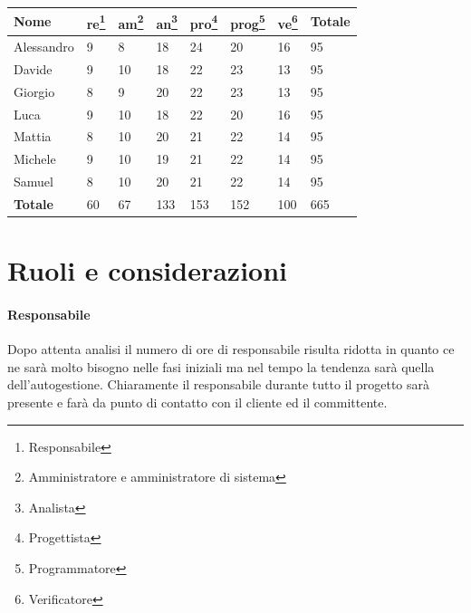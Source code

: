 \begin{center}
    \begin{tabularx}{13cm}{X |l l l l l l| X}
        \textbf{Nome} & \textbf{re}\footnote{Responsabile}
        & \textbf{am}\footnote{Amministratore e amministratore di sistema}
        & \textbf{an}\footnote{Analista}
        & \textbf{pro}\footnote{Progettista}
        & \textbf{prog}\footnote{Programmatore}
        & \textbf{ve}\footnote{Verificatore}
        & \textbf{Totale} \\
        \hline
        Alessandro      & 9           & 8           & 18          & 24           & 20            & 16          & 95              \\
        Davide          & 9           & 10          & 18          & 22           & 23            & 13          & 95              \\
        Giorgio         & 8           & 9           & 20          & 22           & 23            & 13          & 95              \\
        Luca            & 9           & 10          & 18          & 22           & 20            & 16          & 95              \\
        Mattia          & 8           & 10          & 20          & 21           & 22            & 14          & 95              \\
        Michele         & 9           & 10          & 19          & 21           & 22            & 14          & 95              \\
        Samuel          & 8           & 10          & 20          & 21           & 22            & 14          & 95              \\
        \hline
        \textbf{Totale} & 60          & 67          & 133         & 153          & 152           & 100         & 665
    \end{tabularx}
\end{center}

\section{Ruoli e considerazioni}

\paragraph{Responsabile} Dopo attenta analisi il numero di ore di responsabile risulta ridotta in quanto ce ne sarà molto bisogno nelle fasi iniziali ma nel tempo la tendenza sarà quella dell'autogestione. Chiaramente il responsabile durante tutto il progetto sarà presente e farà da punto di contatto con il cliente ed il committente.

